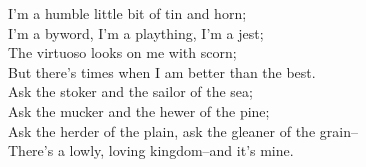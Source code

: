 \begin{poemblock}
I'm a humble little bit of tin and horn;\\
\idt I'm a byword, I'm a plaything, I'm a jest;\\
The virtuoso looks on me with scorn;\\
\idt But there's times when I am better than the best.\\
Ask the stoker and the sailor of the sea;\\
\idt Ask the mucker and the hewer of the pine;\\
Ask the herder of the plain, ask the gleaner of the grain--\\
\idt There's a lowly, loving kingdom--and it's mine.
\end{poemblock}
